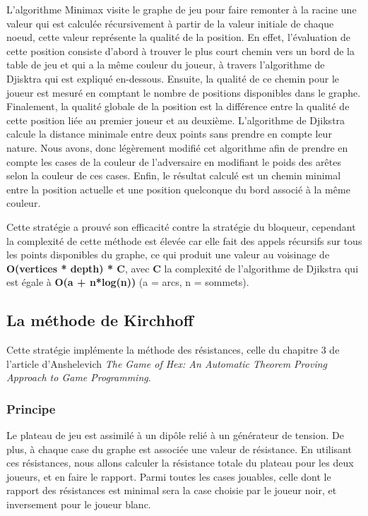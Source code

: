 \documentclass{article}
\begin{document}
L'algorithme Minimax visite le graphe de jeu pour faire remonter à la racine une valeur qui est calculée récursivement à partir de la valeur initiale de chaque noeud, cette valeur représente la qualité de la position. En effet, l'évaluation de cette position consiste d'abord à trouver le plus court chemin vers un bord de la table de jeu et qui a la même couleur du joueur, à travers l'algorithme de Djisktra qui est expliqué en-dessous. Ensuite, la qualité de ce chemin pour le joueur est mesuré en comptant le nombre de positions disponibles dans le graphe. Finalement, la qualité globale de la position est la différence entre la qualité de cette position liée au premier joueur et au deuxième.
L'algorithme de Djikstra calcule la distance minimale entre deux points sans prendre en compte leur nature. Nous avons, donc légèrement modifié cet algorithme afin de prendre en compte les cases de la couleur de l'adversaire en modifiant le poids des arêtes selon la couleur de ces cases. Enfin, le résultat calculé est un chemin minimal entre la position actuelle et une position quelconque du bord associé à la même couleur.

Cette stratégie a prouvé son efficacité contre la stratégie du bloqueur, cependant la complexité de cette méthode est élevée car elle fait des appels récursifs sur tous les points disponibles du graphe, ce qui produit une valeur au voisinage de \textbf{O(vertices * depth) * C}, avec \textbf{C} la complexité de l'algorithme de Djikstra qui est égale à \textbf{O(a + n*log(n))} (a = arcs, n = sommets).

\subsection{La méthode de Kirchhoff}
\vspace{4pt}

Cette stratégie implémente la méthode des résistances, celle du chapitre 3 de l'article d'Anshelevich \textit{The Game of Hex: An Automatic Theorem Proving Approach to Game
Programming}.
\vspace{1pt}

\subsubsection{Principe}
Le plateau de jeu est assimilé à un dipôle relié à un générateur de tension. De plus, à chaque case du graphe est associée une valeur de résistance.
En utilisant ces résistances, nous allons calculer la résistance totale du plateau pour les deux joueurs, et en faire le rapport. Parmi toutes les cases jouables, celle dont le rapport des résistances est minimal sera la case choisie par le joueur noir, et inversement pour le joueur blanc. 
\end{document}
